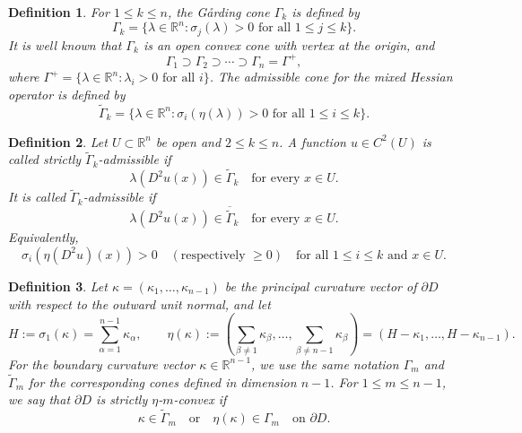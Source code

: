 \documentclass[reqno,a4paper]{amsart}
\numberwithin{equation}{section}
\newtheorem{definition}{Definition}[section]
\begin{document}
	
	\begin{definition}
		For $1 \le k \le n$, the G{\aa}rding cone $\Gamma_k$ is defined by
		\begin{equation}
			\Gamma_k = \{ \lambda \in \mathbb{R}^n : \sigma_j(\lambda) > 0 \text{ for all } 1 \le j \le k \}.
		\end{equation}
		It is well known that $\Gamma_k$ is an open convex cone with vertex at the origin, and
		\[
		\Gamma_1 \supset \Gamma_2 \supset \cdots \supset \Gamma_n = \Gamma^+,
		\]
		where $\Gamma^+ = \{ \lambda \in \mathbb{R}^n : \lambda_i > 0 \text{ for all } i \}$.
		The admissible cone for the mixed Hessian operator is defined by
		\begin{equation}
			\widetilde{\Gamma}_k = \{ \lambda \in \mathbb{R}^n : \sigma_i(\eta(\lambda)) > 0 \text{ for all } 1 \le i \le k \}.
		\end{equation}
	\end{definition}
	
	
	
	\begin{definition}
		Let $U \subset \mathbb{R}^n$ be open and $2 \leq k \leq n$. A function $u \in C^2(U)$ is called strictly $\widetilde{\Gamma}_k$-admissible if
		\[
		\lambda(D^2 u(x)) \in \widetilde{\Gamma}_k \quad \text{for every } x \in U.
		\]
		It is called $\widetilde{\Gamma}_k$-admissible if
		\[
		\lambda(D^2 u(x)) \in \overline{\widetilde{\Gamma}}_k \quad \text{for every } x \in U.
		\]
		Equivalently,
		\[
		\sigma_i(\eta(D^2 u)(x)) > 0 \quad (\text{respectively } \geq 0) \quad \text{for all } 1 \leq i \leq k \text{ and } x \in U.
		\]
	\end{definition}
	
	
	\begin{definition}
		Let $\kappa = (\kappa_1, \ldots, \kappa_{n-1})$ be the principal curvature vector of $\partial D$ with respect to the outward unit normal, and let
		\[
		H := \sigma_1(\kappa) = \sum_{\alpha=1}^{n-1} \kappa_\alpha, \qquad
		\eta(\kappa) := \left( \sum_{\beta \neq 1} \kappa_\beta, \ldots, \sum_{\beta \neq n-1} \kappa_\beta \right) = (H - \kappa_1, \ldots, H - \kappa_{n-1}).
		\]
		For the boundary curvature vector $\kappa \in \mathbb{R}^{n-1}$, we use the same notation $\Gamma_m$ and $\widetilde{\Gamma}_m$ for the corresponding cones defined in dimension $n-1$.
		For $1 \leq m \leq n-1$, we say that $\partial D$ is strictly $\eta$-$m$-convex if
		\[
		\kappa \in \widetilde{\Gamma}_m \quad \text{or} \quad \eta(\kappa) \in \Gamma_m \quad \text{on } \partial D.
		\]
	\end{definition}
	
\end{document}
